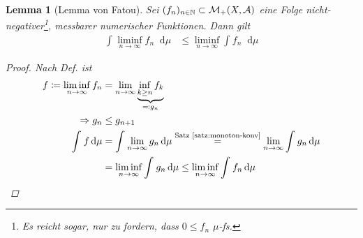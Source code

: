 \documentclass[11pt, twoside, a4paper]{article}
\theoremstyle{plain}
\newtheorem{lemma}[blockelement]{Lemma}
\numberwithin{equation}{subsection}
\newcommand{\of}[1]{\mathopen{}\mathclose{}\bgroup\left(#1\aftergroup\egroup\right)}
\newcommand{\impl}[0]{\Rightarrow{}}
\newcommand{\dif}{\mathop{}\!\mathrm{d}}
\newcommand{\toinf}{\to\infty}
\newcommand{\annot}[3][]{\overset{\text{#3}}#1{#2}}
\newcommand{\N}{\mathbb{N}}
\newcommand{\mA}{\mathcal{A}}
\newcommand{\mM}{\mathcal{M}}
\begin{document}
    \begin{lemma}[Lemma von Fatou]
        \marginnote{[16. Jan]}
        \label{lemma:fatou}
        Sei $(f_n)_{n\in\N} \subset\mM_+\of{X, \mA}$ eine Folge nicht-negativer\footnote{Es reicht sogar, nur zu fordern, dass $0\leq f_n$ $\mu$-fs.}, messbarer numerischer Funktionen. Dann gilt
        \begin{align*}
            \int_{}^{} \liminf_{n\toinf} f_n \dif \mu &\leq \liminf_{n\toinf} \int_{}^{} f_n \dif \mu
        \end{align*}

        \begin{proof}
            Nach Def. ist
            \begin{align*}
                f\coloneqq \liminf_{n\toinf} f_n &= \lim_{n\toinf} \underbrace{\inf_{k\geq n} f_k}_{\eqqcolon g_n}\\
                \impl g_n &\leq g_{n+1}\\
                \int_{}^{} f \dif \mu &= \int_{}^{} \lim_{n\toinf} g_n \dif \mu \annot{=}{Satz~\ref{satz:monoton-konv}} \lim_{n\toinf} \int_{}^{} g_n \dif \mu\\
                &= \liminf_{n\toinf} \int_{}^{} g_n \dif \mu \leq \liminf_{n\toinf} \int_{}^{} f_n \dif \mu\qedhere
            \end{align*}
        \end{proof}
    \end{lemma}
\end{document}
